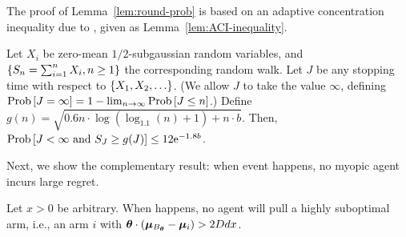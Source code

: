 The proof of Lemma~\ref{lem:round-prob} is based on an adaptive
concentration inequality due to \cite{zhao2016adaptive},
given as Lemma~\ref{lem:ACI-inequality}.

\begin{lemma}
\label{lem:ACI-inequality}
Let $X_i$ be zero-mean $1/2$-subgaussian random variables,
and $\{ S_n = \sum_{i=1}^n X_i, n \geq 1 \}$ the corresponding random walk.
Let $J$ be any stopping time with respect to $\{ X_1, X_2, \ldots \}$.
(We allow $J$ to take the value $\infty$,
defining $\Prob{J = \infty} = 1 - \lim_{n \to \infty} \Prob{J \leq n}$.)
Define 
$g(n)  = \sqrt{0.6 n \cdot \log (\log_{1.1}(n) + 1) + n \cdot b}$.
Then, 
$\Prob{J < \infty \mbox{ and } S_J \geq g(J)} \leq 12 \e^{-1.8 b}$.
\end{lemma}

Next, we show the complementary result:
when event  happens, no myopic agent incurs large regret.

\begin{lemma} \label{lem:right-choice}
Let $x > 0$ be arbitrary.
When  happens,
no agent \AgV will pull a highly suboptimal arm, i.e., an arm $i$ with 
$\bm{\theta} \cdot (\bm{\mu}_{B_{\bm{\theta}}} - \bm{\mu}_{i}) > 2D d x$.
\end{lemma}


